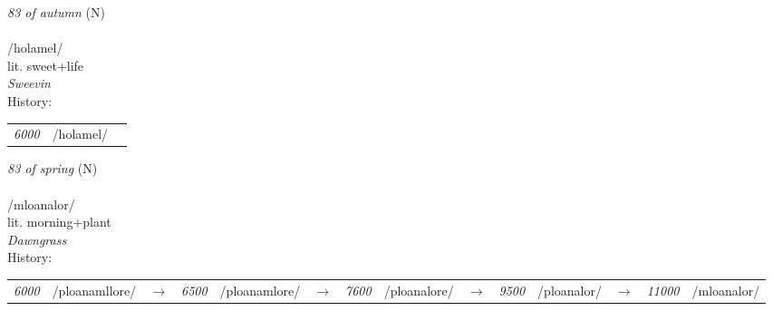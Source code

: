 \vspace{15pt}
\begin{nopagebreak}
 \textit{83 of autumn} (N)\\
\\
\noindent /hol{\textprimstress}amel/\\
\noindent lit. sweet+life\\
\noindent \textit{Sweevin}\\


\noindent History:

\vspace{-0pt}
\hspace{40pt}
\begin{tabular}{ccc}
\textit{6000} & /holamel/& \\
\end{tabular}

\vspace{20pt}\hline

\end{nopagebreak}
\filbreak



\vspace{15pt}
\begin{nopagebreak}
 \textit{83 of spring} (N)\\
\\
\noindent /mloan{\textprimstress}alor/\\
\noindent lit. morning+plant\\
\noindent \textit{Dawngrass}\\


\noindent History:

\vspace{-0pt}
\hspace{40pt}
\begin{tabular}{ccc}
\textit{6000} & /ploanamllore/&$\rightarrow$ & \textit{6500} & /ploanamlore/&$\rightarrow$ & \textit{7600} & /ploanalore/&$\rightarrow$ & \textit{9500} & /ploanalor/&$\rightarrow$ & \textit{11000} & /mloanalor/& \\
\end{tabular}

\vspace{20pt}\hline

\end{nopagebreak}
\filbreak



